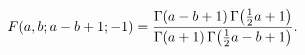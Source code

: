 \[\mathop{F\/}\nolimits\!\left(a,b;a-b+1;-1\right)=\frac{\mathop{\Gamma\/}%
\nolimits\!\left(a-b+1\right)\mathop{\Gamma\/}\nolimits\!\left(\tfrac{1}{2}a+1%
\right)}{\mathop{\Gamma\/}\nolimits\!\left(a+1\right)\mathop{\Gamma\/}%
\nolimits\!\left(\tfrac{1}{2}a-b+1\right)}.\]